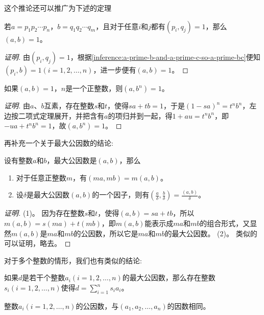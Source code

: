 这个推论还可以推广为下述的定理
\begin{theorem}
  \label{theorem:two-group-prime-without-repeat-prime-each-other}
  若$a=p_1p_2 \cdots p_n$，$b=q_1q_2 \cdots q_m$，且对于任意$i$和$j$都有$(p_i,q_j)=1$，那么$(a,b)=1$。
\end{theorem}

\begin{proof}[证明]
 由$(p_i,q_j)=1$，根据\autoref{inference:a-prime-b-and-a-prime-c-so-a-prime-bc}便知$(p_i, b)=1(i=1,2,\ldots,n)$，进一步便有$(a,b)=1$。
\end{proof}

\begin{theorem}
  如果$(a,b)=1$，$n$是一个正整数，则$(a,b^n)=1$。
\end{theorem}

\begin{proof}[证明]
  由$a$、$b$互素，存在整数$s$和$t$，使得$sa+tb=1$，于是$(1-sa)^n=t^nb^n$，左边按二项式定理展开，并把含有$a$的项归并到一起，得$1+au=t^nb^n$，即$-ua+t^nb^n=1$，故$(a,b^n)=1$。
\end{proof}

再补充一个关于最大公因数的结论:
\begin{theorem}
  设有整数$a$和$b$，最大公因数是$(a,b)$，那么
  \begin{enumerate}
  \item 对于任意正整数$m$，有$(ma, mb)=m(a,b)$。
  \item 设$\delta$是最大公因数$(a,b)$的一个因子，则有$(\frac{a}{\delta}, \frac{b}{\delta})=\frac{(a,b)}{\delta}$。
  \end{enumerate}
\end{theorem}

\begin{proof}[证明]
  (1)。 因为存在整数$s$和$t$，使得$(a,b)=sa+tb$，所以$m(a,b)=s(ma)+t(mb)$，即$m(a,b)$能表示成$ma$和$mb$的组合形式，又显然$m(a,b)$是$ma$和$mb$的公因数，所以它是$ma$和$mb$的最大公因数。
  (2)。 类似的可以证明，略去。
\end{proof}

对于多个整数的情形，我们也有类似的结论:
\begin{theorem}
  如果$d$是若干个整数$a_i(i=1,2,\ldots,n)$的最大公因数，那么存在整数$s_i(i=1,2,\ldots,n)$使得$d=\sum_{i=1}^n s_ia_i$。
\end{theorem}

\begin{inference}
  整数$a_i(i=1,2,\ldots,n)$的公因数，与$(a_1,a_2,\ldots,a_n)$的因数相同。
\end{inference}

